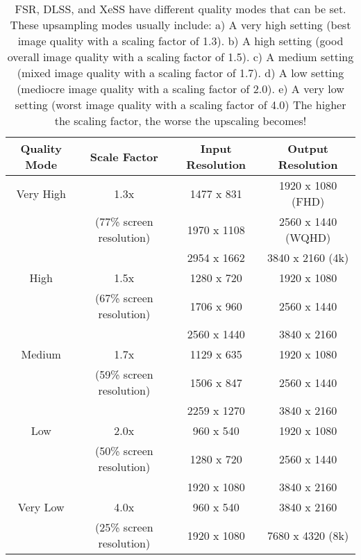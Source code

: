 \documentclass[letterpaper, 10 pt, conference]{ieeeconf}  %
\begin{document}
\begin{table*}[ht]
    \centering
    \caption{FSR, DLSS, and XeSS have different quality modes that can be set. These upsampling modes usually include:
        a) A very high setting (best image quality with a scaling factor of 1.3).
        b) A high setting (good overall image quality with a scaling factor of 1.5).
        c) A medium setting (mixed image quality with a scaling factor of 1.7).
        d) A low setting (mediocre image quality with a scaling factor of 2.0).
        e) A very low setting (worst image quality with a scaling factor of 4.0)
    The higher the scaling factor, the worse the upscaling becomes!}
    \label{tab:qualityModes}
    \begin{tabular}{|c|c|c|c|}
    \hline
    \textbf{Quality Mode} & \textbf{Scale Factor} & \textbf{Input Resolution} & \textbf{Output Resolution} \\
    \hline
    Very High   & 1.3x                          & 1477 x 831  & 1920 x 1080 (FHD) \\
                & (77\% screen resolution)      & 1970 x 1108 & 2560 x 1440 (WQHD) \\
                &                               & 2954 x 1662 & 3840 x 2160 (4k) \\
    \hline
    High        & 1.5x                          & 1280 x 720  & 1920 x 1080 \\
                & (67\% screen resolution)      & 1706 x 960  & 2560 x 1440 \\
                &                               & 2560 x 1440 & 3840 x 2160 \\
    \hline
    Medium      & 1.7x                          & 1129 x 635  & 1920 x 1080 \\
                & (59\% screen resolution)      & 1506 x 847  & 2560 x 1440 \\
                &                               & 2259 x 1270 & 3840 x 2160 \\
    \hline
    Low         & 2.0x                          & 960 x 540   & 1920 x 1080 \\
                & (50\% screen resolution)      & 1280 x 720  & 2560 x 1440 \\
                &                               & 1920 x 1080 & 3840 x 2160 \\
    \hline
    Very Low    & 4.0x                          & 960 x 540   & 3840 x 2160 \\
                & (25\% screen resolution)      & 1920 x 1080 & 7680 x 4320 (8k) \\
    \hline
    \end{tabular}
\end{table*}
\end{document}
